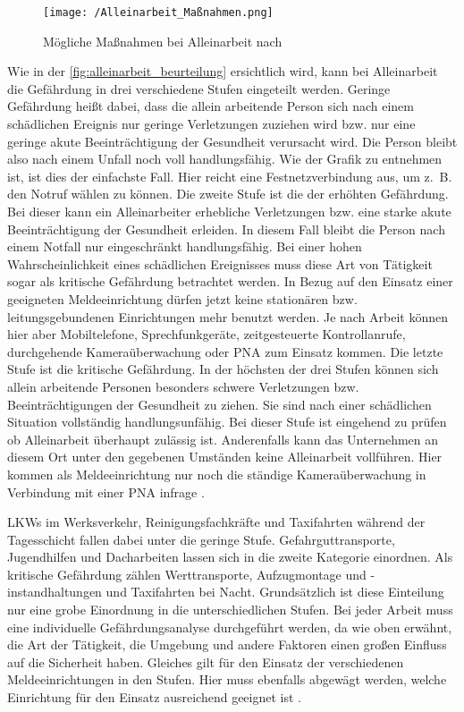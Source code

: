 \documentclass[thesis.tex]{subfiles}
\begin{document}
\begin{figure}[h]
    \centering
    \texttt{[image: /Alleinarbeit\_Maßnahmen.png]}
    \caption[Mögliche Maßnahmen bei Alleinarbeit]{Mögliche Maßnahmen bei Alleinarbeit nach \cite[]{Information_212-139}}
    \label{fig:alleinarbeit_beurteilung}
\end{figure}

Wie in der \autoref{fig:alleinarbeit_beurteilung} ersichtlich wird, kann bei Alleinarbeit die Gefährdung in drei verschiedene Stufen eingeteilt werden.
Geringe Gefährdung heißt dabei, dass die allein arbeitende Person sich nach einem schädlichen Ereignis nur geringe Verletzungen zuziehen wird bzw. nur eine geringe akute Beeinträchtigung der Gesundheit verursacht wird.
Die Person bleibt also nach einem Unfall noch voll handlungsfähig.
Wie der Grafik zu entnehmen ist, ist dies der einfachste Fall.
Hier reicht eine Festnetzverbindung aus, um z.~B. den Notruf wählen zu können.
Die zweite Stufe ist die der erhöhten Gefährdung.
Bei dieser kann ein Alleinarbeiter erhebliche Verletzungen bzw. eine starke akute Beeinträchtigung der Gesundheit erleiden.
In diesem Fall bleibt die Person nach einem Notfall nur eingeschränkt handlungsfähig.
Bei einer hohen Wahrscheinlichkeit eines schädlichen Ereignisses muss diese Art von Tätigkeit sogar als kritische Gefährdung betrachtet werden.
In Bezug auf den Einsatz einer geeigneten Meldeeinrichtung dürfen jetzt keine stationären bzw. leitungsgebundenen Einrichtungen mehr benutzt werden.
Je nach Arbeit können hier aber Mobiltelefone, Sprechfunkgeräte, zeitgesteuerte Kontrollanrufe, durchgehende Kameraüberwachung oder PNA zum Einsatz kommen.
Die letzte Stufe ist die kritische Gefährdung.
In der höchsten der drei Stufen können sich allein arbeitende Personen besonders schwere Verletzungen bzw. Beeinträchtigungen der Gesundheit zu ziehen.
Sie sind nach einer schädlichen Situation vollständig handlungsunfähig.
Bei dieser Stufe ist eingehend zu prüfen ob Alleinarbeit überhaupt zulässig ist.
Anderenfalls kann das Unternehmen an diesem Ort unter den gegebenen Umständen keine Alleinarbeit vollführen.
Hier kommen als Meldeeinrichtung nur noch die ständige Kameraüberwachung in Verbindung mit einer PNA infrage \cite[vgl.~S.~7-9][]{Information_212-139}.

LKWs im Werksverkehr, Reinigungsfachkräfte und Taxifahrten während der Tagesschicht fallen dabei unter die geringe Stufe.
Gefahrguttransporte, Jugendhilfen und Dacharbeiten lassen sich in die zweite Kategorie einordnen.
Als kritische Gefährdung zählen Werttransporte, Aufzugmontage und -instandhaltungen und Taxifahrten bei Nacht.
Grundsätzlich ist diese Einteilung nur eine grobe Einordnung in die unterschiedlichen Stufen.
Bei jeder Arbeit muss eine individuelle Gefährdungsanalyse durchgeführt werden, da wie oben erwähnt, die Art der Tätigkeit, die Umgebung und andere Faktoren einen großen Einfluss auf die Sicherheit haben.
Gleiches gilt für den Einsatz der verschiedenen Meldeeinrichtungen in den Stufen.
Hier muss ebenfalls abgewägt werden, welche Einrichtung für den Einsatz ausreichend geeignet ist \cite[vgl.~S.~7-9][]{Information_212-139}.
\end{document}
